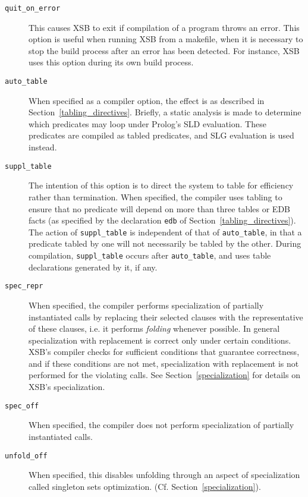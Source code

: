 \begin{description}
\item[{\tt quit\_on\_error}]  This
  causes XSB to exit if compilation of a program throws an error.
  This option is useful when running XSB from a makefile, when it is
  necessary to stop the build process after an error has been
  detected. For instance, XSB uses this option during its own build
  process.


\item[{\tt auto\_table}] When specified as a
  compiler option, the effect is as described in
  Section~\ref{tabling_directives}.  Briefly, a static analysis is made to
  determine which predicates may loop under Prolog's SLD evaluation.  These
  predicates are compiled as tabled predicates, and SLG evaluation is used
  instead.
\item[{\tt suppl\_table}] The intention of this
  option is to direct the system to table for efficiency rather than
  termination.  When specified, the compiler uses tabling to ensure that no
  predicate will depend on more than three tables or EDB facts (as
  specified by the declaration {\tt edb} of
  Section~\ref{tabling_directives}).  The action of {\tt suppl\_table} is
  independent of that of {\tt auto\_table}, in that a predicate tabled by
  one will not necessarily be tabled by the other.  During compilation,
  {\tt suppl\_table} occurs after {\tt auto\_table}, and uses table
  declarations generated by it, if any.
\item[{\tt spec\_repr}]
  When specified, the compiler performs specialization of partially
  instantiated calls by replacing their selected clauses with the
  representative of these clauses, i.e. it performs {\em folding\/}
  whenever possible.  In general specialization with replacement is
  correct only under certain conditions.  XSB's compiler checks for
  sufficient conditions that guarantee correctness, and if these
  conditions are not met, specialization with replacement is not
  performed for the violating calls.  See Section~\ref{specialization}
  for details on XSB's specialization.
\item[{\tt spec\_off}] When
  specified, the compiler does not perform specialization of partially
  instantiated calls.
\item[{\tt unfold\_off}]
  When specified, this disables unfolding through an aspect of
  specialization called singleton sets optimization.
  (Cf. Section~\ref{specialization}).
%


\end{description}
